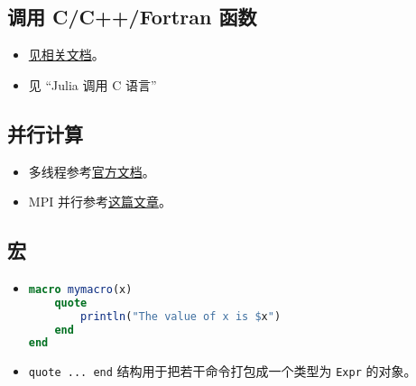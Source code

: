 \subsection{调用 C/C++/Fortran 函数}
\begin{itemize}
\item \href{https://docs.julialang.org/en/v1/manual/calling-c-and-fortran-code/}{见相关文档}。
\item 见 “Julia 调用 C 语言”
\end{itemize}

\subsection{并行计算}
\begin{itemize}
\item 多线程参考\href{https://docs.julialang.org/en/v1/manual/multi-threading/}{官方文档}。
\item MPI 并行参考\href{http://www.claudiobellei.com/2018/09/30/julia-mpi/}{这篇文章}。
\end{itemize}

\subsection{宏}
\begin{itemize}
\item 
\begin{lstlisting}[language=julia]
macro mymacro(x)
    quote
        println("The value of x is $x")
    end
end
\end{lstlisting}
\item \verb|quote ... end| 结构用于把若干命令打包成一个类型为 \verb|Expr| 的对象。
\end{itemize}
